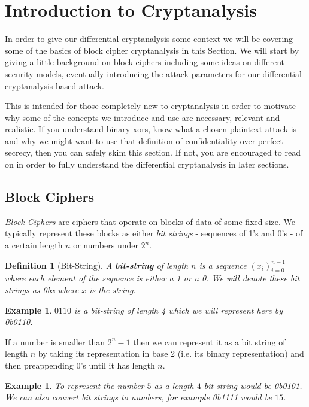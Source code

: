 \documentclass[12pt,a4paper]{article}
\newtheorem{definition}[theorem]{Definition}
\newtheorem{example}[theorem]{Example}
\newcommand{\bin}[1] {0b#1}
\begin{document}
\newpage
\section{Introduction to Cryptanalysis}
\label{sec:intro}
In order to give our differential cryptanalysis some context we will be
covering some of the basics of block cipher cryptanalysis in this Section. We will start by
giving a little background on block ciphers including some ideas on different
security models, eventually introducing the attack parameters for our
differential cryptanalysis based attack. 

This is intended for those completely new to cryptanalysis in order to motivate
why some of the concepts we introduce and use are necessary, relevant and
realistic. If you understand binary xors, know what a chosen plaintext attack
is and why we might want to use that definition of confidentiality over perfect
secrecy, then you can safely skim this section. If not, you are encouraged to
read on in order to fully understand the differential cryptanalysis in later
sections.
\subsection{Block Ciphers}
\textit{Block Ciphers} are ciphers that operate on blocks of data of some fixed
size. We typically represent these blocks as either \textit{bit strings} - sequences of
1's and 0's - of a certain length $n$ or numbers under $2^n$.

\begin{definition}[Bit-String]
A \textbf{bit-string} of length $n$ is a sequence $(x_i)_{i=0}^{n-1}$ where each element
of the sequence is either a 1 or a 0. 
We will denote these bit strings as \bin{x} where $x$ is the string. 
\end{definition}

\begin{example}
$0110$ is a bit-string of length 4 which we will represent here by \bin{0110}.
\end{example}

If a number is smaller than $2^{n}-1$ then we can represent it as a bit string
of length $n$ by taking its representation in base 2 (i.e. its binary
representation) and then preappending 0's until it has length $n$. 

\begin{example}
To represent the number $5$ as a length $4$ bit string would be \bin{0101}. We
can also convert bit strings to numbers, for example \bin{1111} would be $15$. 
\end{example}
\end{document}
